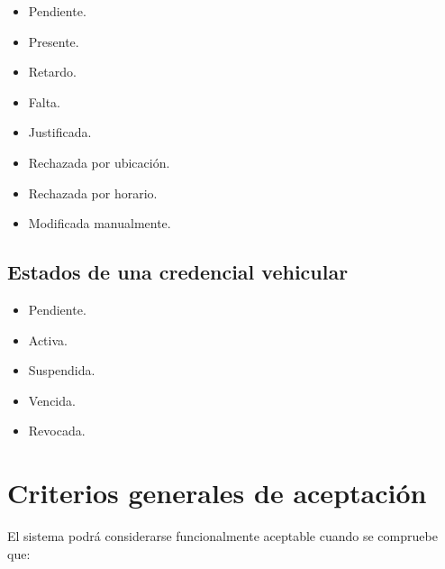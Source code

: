 \documentclass[12pt,a4paper]{article}
\begin{document}
\begin{itemize}[leftmargin=*]
\item Pendiente.
\item Presente.
\item Retardo.
\item Falta.
\item Justificada.
\item Rechazada por ubicación.
\item Rechazada por horario.
\item Modificada manualmente.
\end{itemize}

\subsection{Estados de una credencial vehicular}

\begin{itemize}[leftmargin=*]
\item Pendiente.
\item Activa.
\item Suspendida.
\item Vencida.
\item Revocada.
\end{itemize}

\section{Criterios generales de aceptación}

El sistema podrá considerarse funcionalmente aceptable cuando se compruebe que:
\end{document}
